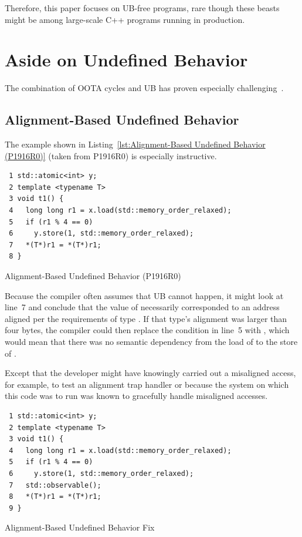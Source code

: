 \documentclass[10]{article}
\begin{document}
Therefore, this paper focuses on UB-free programs, rare though these
beasts might be among large-scale C++ programs running in production.

\clearpage

\section{Aside on Undefined Behavior}
\label{app:Aside on Undefined Behavior}

The combination of OOTA cycles and UB has proven especially
challenging~\cite{DavidGoldblatt2019NoElegantOOTAfix}.

\subsection{Alignment-Based Undefined Behavior}
\label{sec:Alignment-Based Undefined Behavior}

The example shown in
Listing~\ref{lst:Alignment-Based Undefined Behavior (P1916R0)}
(taken from P1916R0) is especially instructive.

\begin{listing}[tbp]
\begin{verbatim}
 1 std::atomic<int> y;
 2 template <typename T>
 3 void t1() {
 4   long long r1 = x.load(std::memory_order_relaxed);
 5   if (r1 % 4 == 0)
 6     y.store(1, std::memory_order_relaxed);
 7   *(T*)r1 = *(T*)r1;
 8 }
\end{verbatim}
\caption{Alignment-Based Undefined Behavior (P1916R0)}
\label{lst:Alignment-Based Undefined Behavior (P1916R0)}
\end{listing}

Because the compiler often assumes that UB cannot happen, it might
look at line~7 and conclude that the value of  necessarily
corresponded to an address aligned per the requirements of type .
If that type's alignment was larger than four bytes, the compiler could
then replace the condition in line~5 with , which would mean
that there was no semantic dependency from the load of  to the
store of .

Except that the developer might have knowingly carried out a misaligned
access, for example, to test an alignment trap handler or because the
system on which this code was to run was known to gracefully handle
misaligned accesses.

\begin{listing}[tbp]
\begin{verbatim}
 1 std::atomic<int> y;
 2 template <typename T>
 3 void t1() {
 4   long long r1 = x.load(std::memory_order_relaxed);
 5   if (r1 % 4 == 0)
 6     y.store(1, std::memory_order_relaxed);
 7   std::observable();
 8   *(T*)r1 = *(T*)r1;
 9 }
\end{verbatim}
\caption{Alignment-Based Undefined Behavior Fix}
\label{lst:Alignment-Based Undefined Behavior Fix}
\end{listing}
\end{document}
